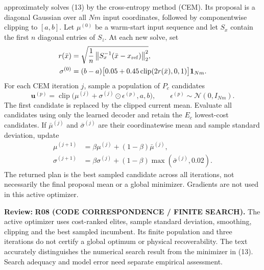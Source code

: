 \documentclass[11pt]{article}
\newcommand{\clip}{\operatorname{clip}}
\newcommand{\review}[1]{\par\noindent\textcolor{red!70!black}{\textbf{Review:} #1}\par}
\newcommand{\code}[1]{\texttt{\detokenize{#1}}}
\begin{document}
\code{DataDrivenCEMSolver} approximately solves (13) by the cross-entropy method (CEM). Its proposal is a diagonal Gaussian over all $Nm$ input coordinates, followed by componentwise clipping to $[a,b]$. Let $\mu^{(0)}$ be a warm-start input sequence and let $S_x$ contain the first $n$ diagonal entries of $S_z$. At each new solve, set
\begin{align}
r(\bar x)&=\sqrt{\frac1n\left\|S_x^{-1}(\bar x-x_{\rm ref})\right\|_2^2},\label{eq:radius}\\
\sigma^{(0)}&=(b-a)\bigl[0.05+0.45\clip(2r(\bar x),0,1)\bigr]\mathbf1_{Nm}.\label{eq:std}
\end{align}
For each CEM iteration $j$, sample a population of $P_c$ candidates
\begin{equation}\label{eq:candidates}
\mathbf u^{(p)}=\clip\bigl(\mu^{(j)}+\sigma^{(j)}\odot\epsilon^{(p)},a,b\bigr),\qquad
\epsilon^{(p)}\sim\mathcal N(0,I_{Nm}).
\end{equation}
The first candidate is replaced by the clipped current mean. Evaluate all candidates using only the learned decoder and retain the $E_c$ lowest-cost candidates. If $\bar\mu^{(j)}$ and $\bar\sigma^{(j)}$ are their coordinatewise mean and sample standard deviation, update
\begin{align}
\mu^{(j+1)}&=\beta\mu^{(j)}+(1-\beta)\bar\mu^{(j)},\label{eq:cemmean}\\
\sigma^{(j+1)}&=\beta\sigma^{(j)}+(1-\beta)\max(\bar\sigma^{(j)},0.02).\label{eq:cemstd}
\end{align}
The returned plan is the best sampled candidate across all iterations, not necessarily the final proposal mean or a global minimizer. Gradients are not used in this active optimizer.
\review{\textbf{R08 (CODE CORRESPONDENCE / FINITE SEARCH).} The active optimizer uses cost-ranked elites, sample standard deviation, smoothing, clipping and the best sampled incumbent. Its finite population and three iterations do not certify a global optimum or physical recoverability. The text accurately distinguishes the numerical search result from the minimizer in (13). Search adequacy and model error need separate empirical assessment.}
\end{document}
